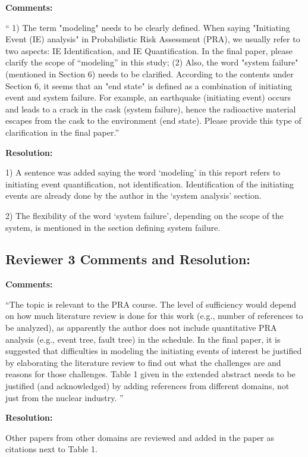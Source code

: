\documentclass[12pt]{article}
\begin{document}
\textbf{Comments:}
\begin{center}
    \begin{varwidth}{0.8\textwidth}


`` 1) The term "modeling" needs to be clearly defined. When saying "Initiating Event (IE) analysis" in Probabilistic Risk Assessment (PRA), we usually refer to two aspects: IE Identification, and IE Quantification. In the final paper, please clarify the scope of “modeling” in this study; (2) Also, the word "system failure" (mentioned in Section 6) needs to be clarified. According to the contents under Section 6, it seems that an "end state" is defined as a combination of initiating event and system failure. For example, an earthquake (initiating event) occurs and leads to a crack in the cask (system failure), hence the radioactive material escapes from the cask to the environment (end state). Please provide this type of clarification in the final paper.''

    \end{varwidth}
\end{center}

\noindent \textbf{Resolution:}

1) A sentence was added saying the word `modeling' in this report refers to 
initiating event quantification, not identification. Identification
of the initiating events are already done by the author in the 
`system analysis' section.

2) The flexibility of the word `system failure', depending on the 
scope of the system,  is mentioned in the section defining system failure.

\subsection{Reviewer 3 Comments and Resolution:}

\textbf{Comments:}
\begin{center}
    \begin{varwidth}{0.8\textwidth}

``The topic is relevant to the PRA course. The level of sufficiency would depend on how much literature review is done for this work (e.g., number of references to be analyzed), as apparently the author does not include quantitative PRA analysis (e.g., event tree, fault tree) in the schedule. In the final paper, it is suggested that difficulties in modeling the initiating events of interest be justified by elaborating the literature review to find out what the challenges are and reasons for those challenges. Table 1 given in the extended abstract needs to be justified (and acknowledged) by adding references from different domains, not just from the nuclear industry. ''

    \end{varwidth}
\end{center}

\noindent \textbf{Resolution:}

Other papers from other domains are reviewed and added in the paper
as citations next to Table 1.


\pagebreak 





\end{document}
